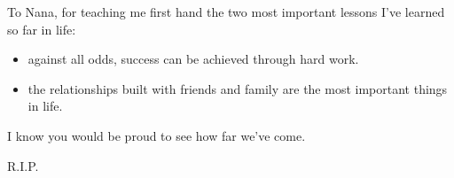 \thispagestyle{empty}
    \null{}
        \begin{flushright}
            \small
            \singlespacing
            To Nana, for teaching me first hand the two most important lessons I've learned so far in life:
            \begin{itemize}
                \item against all odds, success can be achieved through hard work.
                \item the relationships built with friends and family are the most important things in life.
            \end{itemize}
            I know you would be proud to see how far we've come.

            R.I.P.
        \end{flushright}
\null
